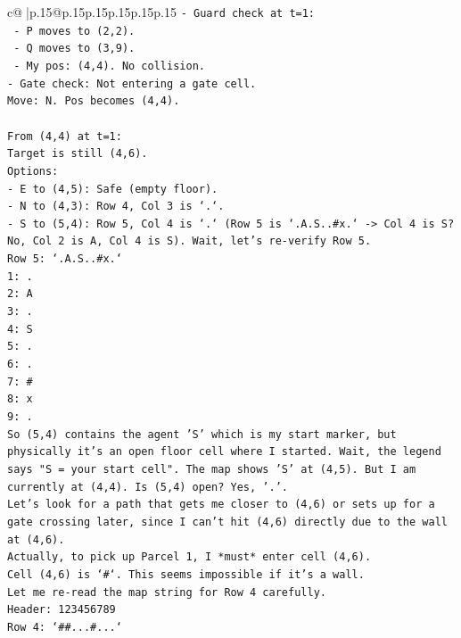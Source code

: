 \documentclass{article}
\begin{document}
{\begin{supertabular}{c@{$\;$}|p{.15\linewidth}@{}p{.15\linewidth}p{.15\linewidth}p{.15\linewidth}p{.15\linewidth}p{.15\linewidth}}
{{{\texttt{{-} Guard check at t=1:} \\
\texttt{  {-} P moves to (2,2).} \\
\texttt{  {-} Q moves to (3,9).} \\
\texttt{  {-} My pos: (4,4). No collision.} \\
\texttt{{-} Gate check: Not entering a gate cell.} \\
\texttt{Move: N. Pos becomes (4,4).} \\
\\ 
\texttt{From (4,4) at t=1:} \\
\texttt{Target is still (4,6).} \\
\texttt{Options:} \\
\texttt{{-} E to (4,5): Safe (empty floor).} \\
\texttt{{-} N to (4,3): Row 4, Col 3 is `.`.} \\
\texttt{{-} S to (5,4): Row 5, Col 4 is `.` (Row 5 is `.A.S..\#x.` {-}> Col 4 is S? No, Col 2 is A, Col 4 is S). Wait, let's re{-}verify Row 5.} \\
\texttt{Row 5: `.A.S..\#x.`} \\
\texttt{1: .} \\
\texttt{2: A} \\
\texttt{3: .} \\
\texttt{4: S} \\
\texttt{5: .} \\
\texttt{6: .} \\
\texttt{7: \#} \\
\texttt{8: x} \\
\texttt{9: .} \\
\texttt{So (5,4) contains the agent 'S' which is my start marker, but physically it's an open floor cell where I started. Wait, the legend says "S = your start cell". The map shows 'S' at (4,5). But I am currently at (4,4). Is (5,4) open? Yes, '.'.} \\
\texttt{Let's look for a path that gets me closer to (4,6) or sets up for a gate crossing later, since I can't hit (4,6) directly due to the wall at (4,6).} \\
\texttt{Actually, to pick up Parcel 1, I *must* enter cell (4,6).} \\
\texttt{Cell (4,6) is `\#`. This seems impossible if it's a wall.} \\
\texttt{Let me re{-}read the map string for Row 4 carefully.} \\
\texttt{Header: 123456789} \\
\texttt{Row 4: `\#\#...\#...`} \\
}}}
\end{supertabular}}
\end{document}
